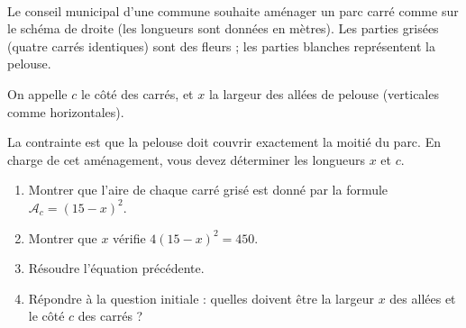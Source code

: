 \documentclass[11pt]{article}
\begin{document}
\begin{exercice}~

  \begin{multicols}{2}

    Le conseil municipal d'une commune souhaite aménager un parc carré comme sur le schéma de droite (les longueurs sont données en mètres). Les parties grisées (quatre carrés identiques) sont des fleurs ; les parties blanches représentent la pelouse.

    \columnbreak

    \begin{center}
    \end{center}

  \end{multicols}

    On appelle $c$ le côté des carrés, et $x$ la largeur des allées de pelouse (verticales comme horizontales).

  La contrainte est que la pelouse doit couvrir exactement la moitié du parc. En charge de cet aménagement, vous devez déterminer les longueurs $x$ et $c$.

  \begin{enumerate}
    \item Montrer que l'aire de chaque carré grisé est donné par la formule $\mathcal{A}_c=(15-x)^2$.
    \item Montrer que $x$ vérifie $4(15-x)^2=450$.
    \item Résoudre l'équation précédente.
    \item Répondre à la question initiale : quelles doivent être la largeur $x$ des allées et le côté $c$ des carrés ?
  \end{enumerate}
\end{exercice}
\end{document}
